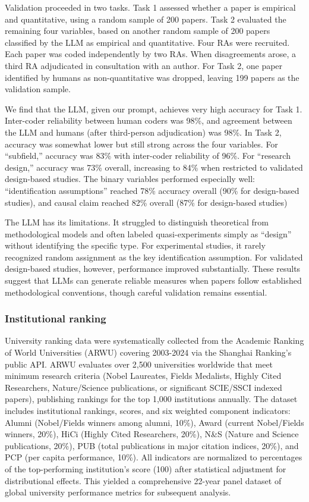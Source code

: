 \documentclass[12pt]{article}
\begin{document}
Validation proceeded in two tasks. Task 1 assessed whether a paper is empirical and quantitative, using a random sample of 200 papers. Task 2 evaluated the remaining four variables, based on another random sample of 200 papers classified by the LLM as empirical and quantitative. Four RAs were recruited. Each paper was coded independently by two RAs. When disagreements arose, a third RA adjudicated in consultation with an author. For Task 2, one paper identified by humans as non-quantitative was dropped, leaving 199 papers as the validation sample.

We find that the LLM, given our prompt, achieves very high accuracy for Task 1. Inter-coder reliability between human coders was 98\%, and agreement between the LLM and humans (after third-person adjudication) was 98\%.  In Task 2, accuracy was somewhat lower but still strong across the four variables. For ``subfield,'' accuracy was 83\% with inter-coder reliability of 96\%. For ``research design,'' accuracy was 73\% overall, increasing to 84\% when restricted to validated design-based studies. The binary variables performed especially well: ``identification assumptions'' reached 78\% accuracy overall (90\% for design-based studies), and causal claim reached 82\% overall (87\% for design-based studies)

The LLM has its limitations. It struggled to distinguish theoretical from methodological models and often labeled quasi-experiments simply as ``design'' without identifying the specific type. For experimental studies, it rarely recognized random assignment as the key identification assumption. For validated design-based studies, however, performance improved substantially. These results suggest that LLMs can generate reliable measures when papers follow established methodological conventions, though careful validation remains essential.

\clearpage

\subsubsection*{Institutional ranking}\label{rankingmeth}

University ranking data were systematically collected from the Academic Ranking of World Universities (ARWU) covering 2003-2024 via the Shanghai Ranking's public API. ARWU evaluates over 2,500 universities worldwide that meet minimum research criteria (Nobel Laureates, Fields Medalists, Highly Cited Researchers, Nature/Science publications, or significant SCIE/SSCI indexed papers), publishing rankings for the top 1,000 institutions annually.
The dataset includes institutional rankings, scores, and six weighted component indicators: Alumni (Nobel/Fields winners among alumni, 10\%), Award (current Nobel/Fields winners, 20\%), HiCi (Highly Cited Researchers, 20\%), N\&S (Nature and Science publications, 20\%), PUB (total publications in major citation indices, 20\%), and PCP (per capita performance, 10\%). All indicators are normalized to percentages of the top-performing institution's score (100) after statistical adjustment for distributional effects. This yielded a comprehensive 22-year panel dataset of global university performance metrics for subsequent analysis.
\end{document}
